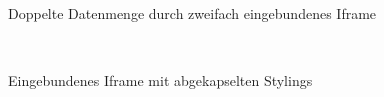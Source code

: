 \begin{figure}[hbt!]
	\centering
	\begin{minipage}[t]{1\textwidth}	
		\caption{Doppelte Datenmenge durch zweifach eingebundenes Iframe}
		\\ %
		\label{fig:EvalIframeSkalierbarkeit}
	\end{minipage}
\end{figure}

\newpage
\begin{figure}[hbt!]
	\centering
	\begin{minipage}[t]{0.5\textwidth}	
		\caption{Eingebundenes Iframe mit abgekapselten Stylings}
		\\ %
		\label{fig:EvalIframeBeeinflussung}
	\end{minipage}
\end{figure}

